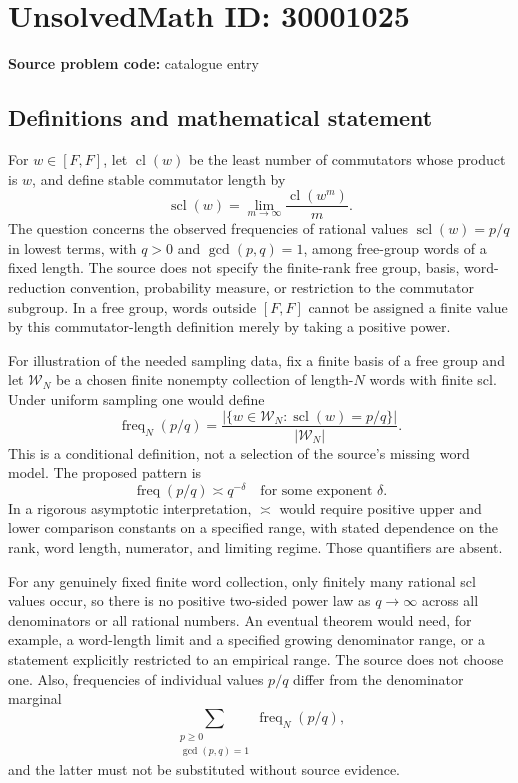 \documentclass[11pt]{article}
\begin{document}
\section*{UnsolvedMath ID: 30001025}
\textbf{Source problem code:} catalogue entry
\subsection{Definitions and mathematical statement}
For \(w\in[F,F]\), let \(\operatorname{cl}(w)\) be the least number of commutators whose product is \(w\), and define stable commutator length by
\[
 \operatorname{scl}(w)=\lim_{m\to\infty}\frac{\operatorname{cl}(w^m)}m.
\]
The question concerns the observed frequencies of rational values \(\operatorname{scl}(w)=p/q\) in lowest terms, with \(q>0\) and \(\gcd(p,q)=1\), among free-group words of a fixed length. The source does not specify the finite-rank free group, basis, word-reduction convention, probability measure, or restriction to the commutator subgroup. In a free group, words outside \([F,F]\) cannot be assigned a finite value by this commutator-length definition merely by taking a positive power.

For illustration of the needed sampling data, fix a finite basis of a free group and let \(\mathcal W_N\) be a chosen finite nonempty collection of length-\(N\) words with finite scl. Under uniform sampling one would define
\[
 \operatorname{freq}_N(p/q)=
 \frac{|\{w\in\mathcal W_N:\operatorname{scl}(w)=p/q\}|}{|\mathcal W_N|}.
\]
This is a conditional definition, not a selection of the source's missing word model. The proposed pattern is
\[
 \operatorname{freq}(p/q)\asymp q^{-\delta}
 \quad\text{for some exponent }\delta.
\]
In a rigorous asymptotic interpretation, \(\asymp\) would require positive upper and lower comparison constants on a specified range, with stated dependence on the rank, word length, numerator, and limiting regime. Those quantifiers are absent.

For any genuinely fixed finite word collection, only finitely many rational scl values occur, so there is no positive two-sided power law as \(q\to\infty\) across all denominators or all rational numbers. An eventual theorem would need, for example, a word-length limit and a specified growing denominator range, or a statement explicitly restricted to an empirical range. The source does not choose one. Also, frequencies of individual values \(p/q\) differ from the denominator marginal
\[
 \sum_{\substack{p\geq0\\\gcd(p,q)=1}}\operatorname{freq}_N(p/q),
\]
and the latter must not be substituted without source evidence.
\end{document}
